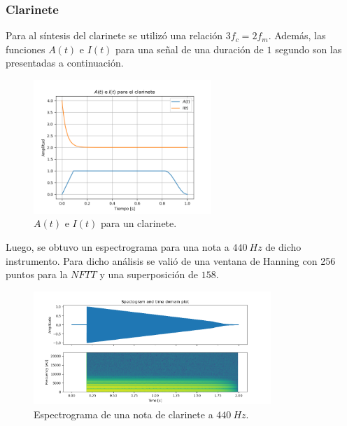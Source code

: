 \subsubsection{Clarinete}
Para al síntesis del clarinete se utilizó una relación $3 f_c  = 2 f_m$. Además, las funciones $A(t)$ e $I(t)$ para una señal de una duración de $1$ segundo son las presentadas a continuación.
\begin{figure}[H]
	\centering
	\includegraphics[width=0.6\textwidth]{ImagenesEjercicio3/A-I-Clarinet.png}
	\caption{$A(t)$ e $I(t)$ para un clarinete.}
	\label{fig:aiclar}
\end{figure}

Luego, se obtuvo un espectrograma para una nota a $440 \ Hz$ de dicho instrumento. Para dicho análisis se valió de una ventana de Hanning con 256 puntos para la $NFTT$ y una superposición de $158$.  
\begin{figure}[H]
	\centering
	\includegraphics[width=0.8\textwidth]{ImagenesEjercicio3/Clarinet-440-Hanning-256-158.png}
	\caption{Espectrograma de una nota de clarinete a $440 \ Hz$.}
	\label{fig:specclar}
\end{figure}

